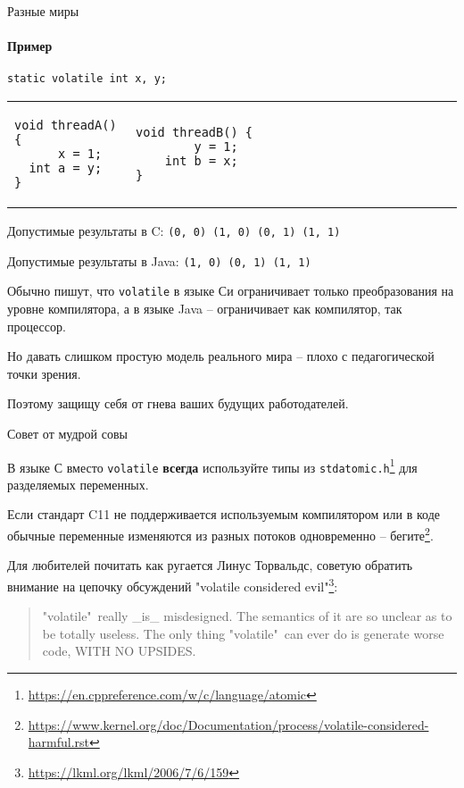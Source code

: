 \begin{frame}{Разные миры}
\framesubtitle{Пример}

\begin{verbatim}
static volatile int x, y; 
\end{verbatim}

\begin{tabular}{p{} p{}}
\begin{verbatim}
void threadA() {
      x = 1;
  int a = y;
}
\end{verbatim}

& 

\begin{verbatim}
void threadB() {                                   
        y = 1;                           
    int b = x;                           
}                    
\end{verbatim}
\end{tabular}

Допустимые результаты в C: \texttt{(0, 0) (1, 0) (0, 1) (1, 1)}

Допустимые результаты в Java: \texttt{(1, 0) (0, 1) (1, 1)}

\pause
Обычно пишут, что \texttt{volatile} в языке Си ограничивает только преобразования на уровне компилятора, а в языке Java -- ограничивает как компилятор, так процессор.

\pause
Но давать слишком простую модель реального мира -- плохо с педагогической точки зрения.

\pause
Поэтому защищу себя от гнева ваших будущих работодателей.

\end{frame}


\begin{frame}{Совет от мудрой совы}

В языке С вместо \texttt{volatile} \textbf{всегда} используйте типы из \texttt{stdatomic.h}\footnote{\tiny\url{https://en.cppreference.com/w/c/language/atomic}} для разделяемых переменных.

\pause

Если стандарт C11 не поддерживается используемым компилятором или в коде обычные переменные изменяются из разных потоков одновременно -- бегите\footnote<2->{\tiny\url{https://www.kernel.org/doc/Documentation/process/volatile-considered-harmful.rst}}.

\pause

Для любителей почитать как ругается Линус Торвальдс, советую обратить внимание на цепочку обсуждений "volatile considered evil"\footnote<3->{\tiny\url{https://lkml.org/lkml/2006/7/6/159}}:

\begin{quote}
 "volatile"\ really \_is\_ misdesigned. The semantics of it are so unclear as to be totally useless. The only thing "volatile"\ can ever do is generate worse code, WITH NO UPSIDES.
\end{quote}

\end{frame}



